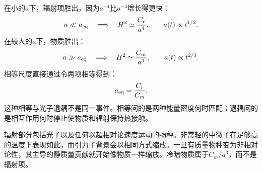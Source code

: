 在小的\(a\)下，辐射项胜出，因为\(a^{-4}\)比\(a^{-3}\)增长得更快：
\begin{equation}
a\ll a_{\rm eq}
\quad\Longrightarrow\quad
H^2\simeq\frac{C_r}{a^4},
\qquad
a(t)\propto t^{1/2}.
\end{equation}
在较大的\(a\)下，物质胜出：
\begin{equation}
a\gg a_{\rm eq}
\quad\Longrightarrow\quad
H^2\simeq\frac{C_m}{a^3},
\qquad
a(t)\propto t^{2/3}.
\end{equation}
相等尺度直接通过令两项相等得到：
\begin{equation}
a_{\rm eq}=\frac{C_r}{C_m}.
\label{eq:c02-equality-scale}
\end{equation}
这种相等与光子退耦不是同一事件。相等问的是两种能量密度何时匹配；退耦问的是相互作用何时停止使物质和辐射保持热接触。

辐射部分包括光子以及任何以超相对论速度运动的物种。非常轻的中微子在足够高的温度下表现如此，而引力子背景会以相同方式缩放。一旦有质量物种变为非相对论性，其主导的静质量贡献就开始像物质一样缩放。冷暗物质属于\(C_m/a^3\)，而不是辐射项。

\begin{classroomqa}
\end{classroomqa}

\begin{classroomqa}
\end{classroomqa}

\begin{classroomqa}
\end{classroomqa}

